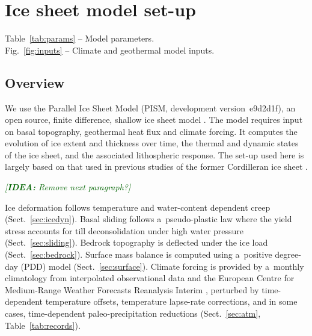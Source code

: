 \documentclass[tc, manuscript]{copernicus}
\newcommand{\idea}[1]{\textcolor{darkgreen}{\emph{[\textbf{IDEA:} #1]}}}
\begin{document}
\section{Ice sheet model set-up}
\label{sec:model}

    Table~\ref{tab:params} -- Model parameters.\\
    Fig.~\ref{fig:inputs} -- Climate and geothermal model inputs.\\


\subsection{Overview}
\label{sec:overview}

    We use the Parallel Ice Sheet Model (PISM, development version~e9d2d1f), an
    open source, finite difference, shallow ice sheet model
    \citep{PISM-authors.2017}. The model requires input on basal
    topography, geothermal heat flux and climate forcing. It computes the
    evolution of ice extent and thickness over time, the thermal and dynamic
    states of the ice sheet, and the associated lithospheric response. The
    set-up used here is largely based on that used in previous studies of the
    former Cordilleran ice sheet \citep{Seguinot.2014, Seguinot.etal.2014,
    Seguinot.etal.2016}.

    \idea{Remove next paragraph?}

    Ice deformation follows temperature and water-content dependent creep
    (Sect.~\ref{sec:icedyn}). Basal sliding follows a~pseudo-plastic law where
    the yield stress accounts for till deconsolidation under high water
    pressure (Sect.~\ref{sec:sliding}). Bedrock topography is deflected
    under the ice load (Sect.~\ref{sec:bedrock}). Surface mass balance is
    computed using a~positive degree-day (PDD) model (Sect.~\ref{sec:surface}).
    Climate forcing is provided by a~monthly climatology from interpolated
    observational data \citep[WorldClim;][]{Hijmans.etal.2005} and the European
    Centre for Medium-Range Weather Forecasts Reanalysis Interim
    \citep[ERA-Interim;][]{Dee.etal.2011}, perturbed by time-dependent
    temperature offsets, temperature lapse-rate corrections, and in some cases,
    time-dependent paleo-precipitation reductions (Sect.~\ref{sec:atm},
    Table~\ref{tab:records}).
\end{document}
